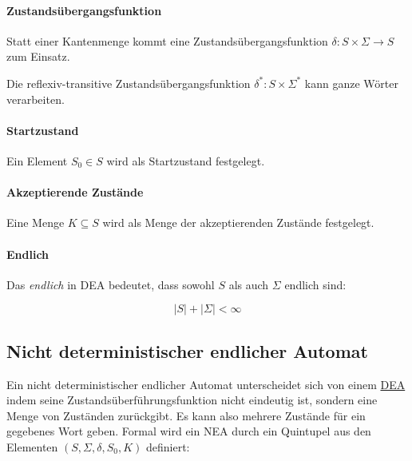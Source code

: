 \documentclass[../main.tex]{subfiles}
\begin{document}
                \paragraph{Zustandsübergangsfunktion}
                    Statt einer Kantenmenge kommt eine Zustandsübergangsfunktion $\delta\colon S \times \Sigma \rightarrow S$ zum Einsatz.
                    
                    Die reflexiv-transitive Zustandsübergangsfunktion $\delta^*\colon S \times \Sigma^*$ kann ganze Wörter verarbeiten.
                    
                
                    
                \paragraph{Startzustand}
                    Ein Element $S_0 \in S$ wird als Startzustand festgelegt.
                
                \paragraph{Akzeptierende Zustände}
                    Eine Menge $K \subseteq S$ wird als Menge der akzeptierenden Zustände festgelegt.
                    
                \paragraph{Endlich}
                    Das \emph{endlich} in DEA bedeutet, dass sowohl $S$ als auch $\Sigma$ endlich sind:
                    
                    \begin{equation}
                        |S| + |\Sigma| < \infty
                    \end{equation}
                    
        \subsection[NEA]{Nicht deterministischer endlicher Automat}
            Ein nicht deterministischer endlicher Automat unterscheidet sich von einem \hyperref[section:DiskreteMathematik:FormaleGrundlagen:DEA]{DEA} indem seine Zustandsüberführungsfunktion nicht eindeutig ist, sondern eine Menge von Zuständen zurückgibt. Es kann also mehrere Zustände für ein gegebenes Wort geben.
            Formal wird ein NEA durch ein Quintupel aus den Elementen $(S, \Sigma, \delta, S_0, K)$ definiert:
            
\end{document}
